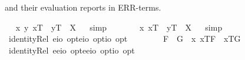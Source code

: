 \begin{isabellebody}
\begin{isamarkuptext}
  and their evaluation reports in ERR-terms.%
\end{isamarkuptext}%
\isamarkuptrue%
\ \isamarkupfalse%
\ {\isachardoublequoteopen}\isactrlbold {\isasymlambda}x\ y{\isachardot}\ x\isactrlsup T\ \isactrlbold {\isacharequal}\ y\isactrlsup T{\isacharparenright}\ {\isacharequal}\ X{\isachardoublequoteclose}%
\isadelimproof
\ %
\endisadelimproof
%
\isatagproof
{}\isamarkupfalse%
\ simp\ \isamarkupfalse%
\ \ \ %
%
\endisatagproof
{\isafoldproof}%
%
\isadelimproof
%
\endisadelimproof
\isanewline
\ \isamarkupfalse%
\ {\isachardoublequoteopen}{\isacharparenleft}\isactrlbold {\isasymlambda}x{\isachardot}\ x\isactrlsup T\ \isactrlbold {\isacharequal}\ y\isactrlsup T{\isacharparenright}\ {\isacharequal}\ X{\isachardoublequoteclose}%
\isadelimproof
\ %
\endisadelimproof
%
\isatagproof
{}\isamarkupfalse%
\ simp\ \isamarkupfalse%
\ \ \ %
%
\endisatagproof
{\isafoldproof}%
%
\isadelimproof
%
\endisadelimproof
%
\isamarkuptrue%
\ \isamarkupfalse%
\ identityRel{}{\isacharcolon}{\isacharcolon}{\isachardoublequoteopen}\ {\isacharparenleft}{\isacharparenleft}e{\isasymRightarrow}io{\isacharparenright}\ opt{\isacharparenright}{\isasymRightarrow}{\isacharparenleft}{\isacharparenleft}e{\isasymRightarrow}io{\isacharparenright}\ opt{\isacharparenright}{\isasymRightarrow}io\ opt{\isachardoublequoteclose}\ {\isacharparenleft}\ {\isachardoublequoteopen}\isactrlbold {\isacharequal}\ {}{}{\isacharparenright}\ \isanewline
\ \ \ \ {\isachardoublequoteopen}F{}\ \isactrlbold {\isacharequal}\ G{}\ {\isasymequiv}\ \isactrlbold {\isasymbox}{\isacharparenleft}\isactrlbold {\isasymforall}x{\isachardot}\ {\isasymlbrace}x\isactrlsup T{\isacharcomma}F{}{\isasymrbrace}\ \isactrlbold {\isasymequiv}\ {\isasymlbrace}x\isactrlsup T{\isacharcomma}G{}{\isasymrbrace}{\isacharparenright}{\isachardoublequoteclose}\isanewline
\isanewline
\ \isamarkupfalse%
\ identityRel{}{\isacharcolon}{\isacharcolon}{\isachardoublequoteopen}\ {\isacharparenleft}{\isacharparenleft}e{\isasymRightarrow}e{\isasymRightarrow}io{\isacharparenright}\ opt{\isacharparenright}{\isasymRightarrow}{\isacharparenleft}{\isacharparenleft}e{\isasymRightarrow}e{\isasymRightarrow}io{\isacharparenright}\ opt{\isacharparenright}{\isasymRightarrow}io\ opt{\isachardoublequoteclose}\ {\isacharparenleft}\ {\isachardoublequoteopen}\isactrlbold {\isacharequal}\ {}{}{\isacharparenright}\ \isanewline

\end{isabellebody}
